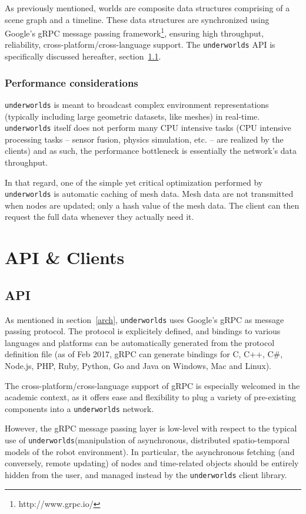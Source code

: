 \documentclass[letterpaper, 10 pt, conference]{ieeeconf}  %
\newcommand{\uwds}{{\tt underworlds}\xspace}
\begin{document}
As previously mentioned, worlds are composite data structures comprising of a
scene graph and a timeline. These data structures are synchronized using
Google's gRPC message passing framework\footnote{http://www.grpc.io/}, ensuring
high throughput, reliability, cross-platform/cross-language support. The \uwds
API is specifically discussed hereafter, section~\ref{api}.


\subsubsection*{Performance considerations}

\uwds is meant to broadcast complex environment representations (typically
including large geometric datasets, like meshes) in real-time. \uwds itself does
not perform many CPU intensive tasks (CPU intensive processing tasks -- sensor fusion, physics
simulation, etc. -- are realized by the clients) and as such, the performance
bottleneck is essentially the network's data throughput.

In that regard, one of the simple yet critical optimization performed by \uwds
is automatic caching of mesh data. Mesh data are not transmitted when nodes are
updated; only a hash value of the mesh data. The client can then request the
full data whenever they actually need it.



\section{API \& Clients}

\subsection{API}
\label{api}

As mentioned in section~\ref{arch}, \uwds uses Google's gRPC as message passing
protocol. The protocol is explicitely defined, and bindings to various languages
and platforms can be automatically generated from the protocol definition file
(as of Feb 2017, gRPC can generate bindings for C, C++, C\#, Node.js, PHP, Ruby,
Python, Go and Java on Windows, Mac and Linux).

The cross-platform/cross-language support of gRPC is especially welcomed in the
academic context, as it offers ease and flexibility to plug a variety of
pre-existing components into a \uwds network.


However, the gRPC message passing layer is low-level with respect to the typical
use of \uwds (manipulation of asynchronous, distributed spatio-temporal models
of the robot environment). In particular, the asynchronous fetching (and
conversely, remote updating) of nodes and time-related objects should be
entirely hidden from the user, and managed instead by the \uwds client library.
\end{document}
